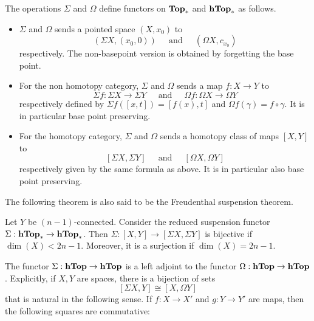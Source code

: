 \documentclass[a4paper]{article}
\begin{document}
\begin{thm}{}{} The operations $\Sigma$ and $\Omega$ define functors on $\bold{Top}_\ast$ and $\bold{hTop}_\ast$ as follows. 
\begin{itemize}
\item $\Sigma$ and $\Omega$ sends a pointed space $(X,x_0)$ to $$(\Sigma X,(x_0,0))\;\;\;\;\text{ and }\;\;\;\;(\Omega X,c_{x_0})$$ respectively. The non-basepoint version is obtained by forgetting the base point. 
\item For the non homotopy category, $\Sigma$ and $\Omega$ sends a map $f:X\to Y$ to $$\Sigma f:\Sigma X\to\Sigma Y\;\;\;\;\text{ and }\;\;\;\;\Omega f:\Omega X\to\Omega Y$$ respectively defined by $\Sigma f([x,t])=[f(x),t]$ and $\Omega f(\gamma)=f\circ\gamma$. It is in particular base point preserving. 
\item For the homotopy category, $\Sigma$ and $\Omega$ sends a homotopy class of maps $[X,Y]$ to $$[\Sigma X,\Sigma Y]\;\;\;\;\text{ and }\;\;\;\;[\Omega X,\Omega Y]$$ respectively given by the same formula as above. It is in particular also base point preserving. 
\end{itemize}
\end{thm}

The following theorem is also said to be the Freudenthal suspension theorem. 

\begin{thm}{}{} Let $Y$ be $(n-1)$-connected. Consider the reduced suspension functor $\Sigma:\bold{hTop}_\ast\to\bold{hTop}_\ast$. Then $\Sigma:[X,Y]\to[\Sigma X,\Sigma Y]$ is bijective if $\dim(X)<2n-1$. Moreover, it is a surjection if $\dim(X)=2n-1$. 
\end{thm}

\begin{thm}{}{} The functor $\Sigma:\bold{hTop}\to\bold{hTop}$ is a left adjoint to the functor $\Omega:\bold{hTop}\to\bold{hTop}$. Explicitly, if $X,Y$ are spaces, there is a bijection of sets $$[\Sigma X,Y]\cong[X,\Omega Y]$$ that is natural in the following sense. If $f:X\to X'$ and $g:Y\to Y'$ are maps, then the following squares are commutative: \\~\\
\\~\\
\end{thm}
\end{document}

